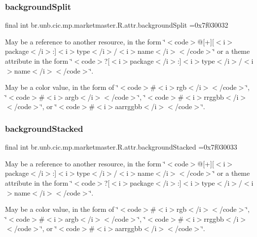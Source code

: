 \subsubsection{\texorpdfstring{background\+Split}{backgroundSplit}}
{\footnotesize\ttfamily final int br.\+unb.\+cic.\+mp.\+marketmaster.\+R.\+attr.\+background\+Split =0x7f030032\hspace{0.3cm}{\ttfamily [static]}}

May be a reference to another resource, in the form \char`\"{}$<$code$>$@\mbox{[}+\mbox{]}\mbox{[}$<$i$>$package$<$/i$>$\+:\mbox{]}$<$i$>$type$<$/i$>$/$<$i$>$name$<$/i$>$$<$/code$>$\char`\"{} or a theme attribute in the form \char`\"{}$<$code$>$?\mbox{[}$<$i$>$package$<$/i$>$\+:\mbox{]}$<$i$>$type$<$/i$>$/$<$i$>$name$<$/i$>$$<$/code$>$\char`\"{}. 

May be a color value, in the form of \char`\"{}$<$code$>$\#$<$i$>$rgb$<$/i$>$$<$/code$>$\char`\"{}, \char`\"{}$<$code$>$\#$<$i$>$argb$<$/i$>$$<$/code$>$\char`\"{}, \char`\"{}$<$code$>$\#$<$i$>$rrggbb$<$/i$>$$<$/code$>$\char`\"{}, or \char`\"{}$<$code$>$\#$<$i$>$aarrggbb$<$/i$>$$<$/code$>$\char`\"{}. \mbox{\label{classbr_1_1unb_1_1cic_1_1mp_1_1marketmaster_1_1R_1_1attr_a6ec7a24ee49256c60b7aab5971b8a71b}} 
\subsubsection{\texorpdfstring{background\+Stacked}{backgroundStacked}}
{\footnotesize\ttfamily final int br.\+unb.\+cic.\+mp.\+marketmaster.\+R.\+attr.\+background\+Stacked =0x7f030033\hspace{0.3cm}{\ttfamily [static]}}

May be a reference to another resource, in the form \char`\"{}$<$code$>$@\mbox{[}+\mbox{]}\mbox{[}$<$i$>$package$<$/i$>$\+:\mbox{]}$<$i$>$type$<$/i$>$/$<$i$>$name$<$/i$>$$<$/code$>$\char`\"{} or a theme attribute in the form \char`\"{}$<$code$>$?\mbox{[}$<$i$>$package$<$/i$>$\+:\mbox{]}$<$i$>$type$<$/i$>$/$<$i$>$name$<$/i$>$$<$/code$>$\char`\"{}. 

May be a color value, in the form of \char`\"{}$<$code$>$\#$<$i$>$rgb$<$/i$>$$<$/code$>$\char`\"{}, \char`\"{}$<$code$>$\#$<$i$>$argb$<$/i$>$$<$/code$>$\char`\"{}, \char`\"{}$<$code$>$\#$<$i$>$rrggbb$<$/i$>$$<$/code$>$\char`\"{}, or \char`\"{}$<$code$>$\#$<$i$>$aarrggbb$<$/i$>$$<$/code$>$\char`\"{}. \mbox{\label{classbr_1_1unb_1_1cic_1_1mp_1_1marketmaster_1_1R_1_1attr_ad32b32af176d8df3a73f5f45b01f6c4f}} 
